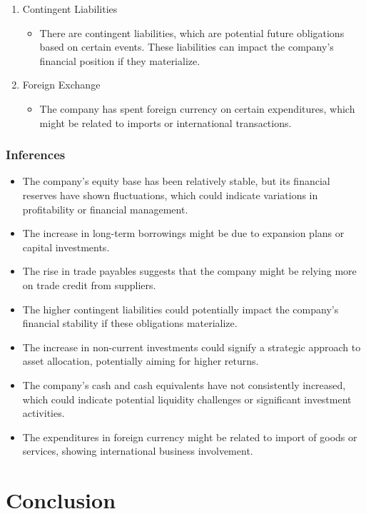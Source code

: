 \begin{enumerate}
\item Contingent Liabilities 
\begin{itemize}
  \item There are contingent liabilities, which are potential future obligations based on certain events. These liabilities can impact the company's financial position if they materialize.
\end{itemize}

\item Foreign Exchange
\begin{itemize}
  \item The company has spent foreign currency on certain expenditures, which might be related to imports or international transactions.
\end{itemize}
\end{enumerate}

\subsubsection{Inferences}
\begin{itemize}
  \item The company's equity base has been relatively stable, but its financial reserves have shown fluctuations, which could indicate variations in profitability or financial management.
  \item The increase in long-term borrowings might be due to expansion plans or capital investments.
  \item The rise in trade payables suggests that the company might be relying more on trade credit from suppliers.
  \item The higher contingent liabilities could potentially impact the company's financial stability if these obligations materialize.
  \item The increase in non-current investments could signify a strategic approach to asset allocation, potentially aiming for higher returns.
  \item The company's cash and cash equivalents have not consistently increased, which could indicate potential liquidity challenges or significant investment activities.
  \item The expenditures in foreign currency might be related to import of goods or services, showing international business involvement.
\end{itemize}


\section{Conclusion}

